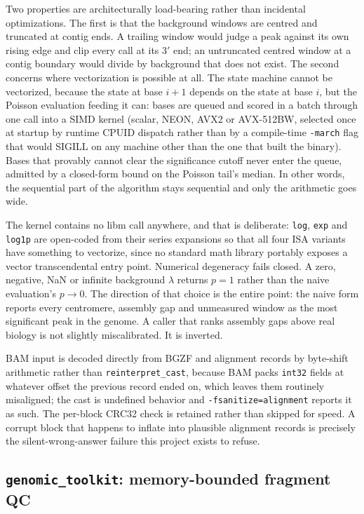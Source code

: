\documentclass[10pt,twocolumn]{article}
\begin{document}
Two properties are architecturally load-bearing rather than incidental
optimizations. The first is that the background windows are centred and
truncated at contig ends. A trailing window would judge a peak against its
own rising edge and clip every call at its 3$'$ end; an untruncated centred
window at a contig boundary would divide by background that does not exist.
The second concerns where vectorization is possible at all. The state machine
cannot be vectorized, because the state at base $i{+}1$ depends on the state
at base $i$, but the Poisson evaluation feeding it can: bases are queued and
scored in a batch through one call into a SIMD kernel (scalar, NEON, AVX2 or
AVX-512BW, selected once at startup by runtime CPUID dispatch rather than by
a compile-time \texttt{-march} flag that would SIGILL on any machine other
than the one that built the binary). Bases that provably cannot clear the
significance cutoff never enter the queue, admitted by a closed-form bound on
the Poisson tail's median. In other words, the sequential part of the
algorithm stays sequential and only the arithmetic goes wide.

The kernel contains no libm call anywhere, and that is deliberate:
\texttt{log}, \texttt{exp} and \texttt{log1p} are open-coded from their
series expansions so that all four ISA variants have something to vectorize,
since no standard math library portably exposes a vector transcendental
entry point. Numerical degeneracy fails closed. A zero, negative, NaN or
infinite background $\lambda$ returns $p=1$ rather than the naive
evaluation's $p \to 0$. The direction of that choice is the entire point: the
naive form reports every centromere, assembly gap and unmeasured window as
the most significant peak in the genome. A caller that ranks assembly gaps
above real biology is not slightly miscalibrated. It is inverted.

BAM input is decoded directly from BGZF and alignment records by byte-shift
arithmetic rather than \texttt{reinterpret\_cast}, because BAM packs
\texttt{int32} fields at whatever offset the previous record ended on, which
leaves them routinely misaligned; the cast is undefined behavior and
\texttt{-fsanitize=alignment} reports it as such. The per-block CRC32 check is
retained rather than skipped for speed. A corrupt block that happens to
inflate into plausible alignment records is precisely the silent-wrong-answer
failure this project exists to refuse.

\subsection{\texttt{genomic\_toolkit}: memory-bounded fragment QC}
\label{sec:gtk}
\end{document}
